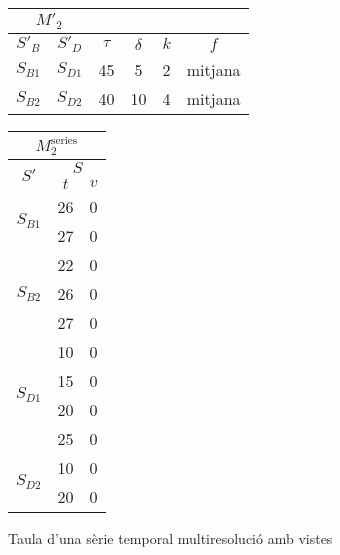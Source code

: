 \begin{figure}[tp]
  \centering
  \begin{tabular}{|c|c|c|c|c|c|}
    \multicolumn{2}{c}{$M'_2$} \\ \hline
    $S'_B$  & $S'_D$ & $\tau$ & $\delta$ & $k$ & $f$ \\ \hline
    $S_{B1}$ & $S_{D1}$ & 45 & 5  & 2 & mitjana  \\
    $S_{B2}$ & $S_{D2}$ & 40 & 10 & 4 & mitjana  \\ \hline
  \end{tabular}\qquad
  \begin{tabular}{|c|c|c|}
    \multicolumn{3}{c}{$M^{\text{series}}_{2}$} \\ \hline
    \multirow{2}{*}{$S'$}  &  \multicolumn{2}{c|}{$S$} \\ \cline{2-3}
    & $t$      & $v$  \\ \hline
    \multirow{2}{*}{$S_{B1}$} 
    & 26 & 0 \\ 
    & 27 & 0 \\ \hline
    \multirow{3}{*}{$S_{B2}$} 
    & 22 & 0 \\ 
    & 26 & 0 \\ 
    & 27 & 0 \\ \hline
    \multirow{4}{*}{$S_{D1}$} 
    & 10 & 0 \\ 
    & 15 & 0 \\ 
    & 20 & 0 \\ 
    & 25 & 0 \\ \hline
    \multirow{2}{*}{$S_{D2}$} 
    & 10 & 0 \\ 
    & 20 & 0 \\ \hline
  \end{tabular}
  \caption{Taula d'una sèrie temporal multiresolució amb vistes}
  \label{fig:model:stm:vistes}
\end{figure}






